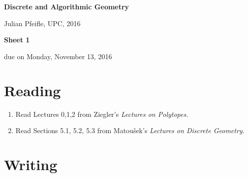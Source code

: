 \documentclass[11pt]{amsart}
\begin{document}
\begin{center}
\textbf{\sffamily
   Discrete and Algorithmic Geometry }

\medskip
   Julian Pfeifle,
   UPC, 2016
\end{center}

\bigskip

\begin{center}
  \textbf{\sffamily Sheet 1}

\bigskip
 due on Monday, November 13, 2016

\end{center}

\bigskip
\bigskip
\bigskip

\section*{Reading}

\begin{enumerate}
\setlength{\itemsep}{2ex}
\item Read Lectures 0,1,2 from Ziegler's \emph{Lectures on Polytopes}.

\item Read Sections 5.1, 5.2, 5.3 from Matou\v sek's \emph{Lectures on
    Discrete Geometry}.

\end{enumerate}

\bigskip
\bigskip
\section*{Writing}
\end{document}
